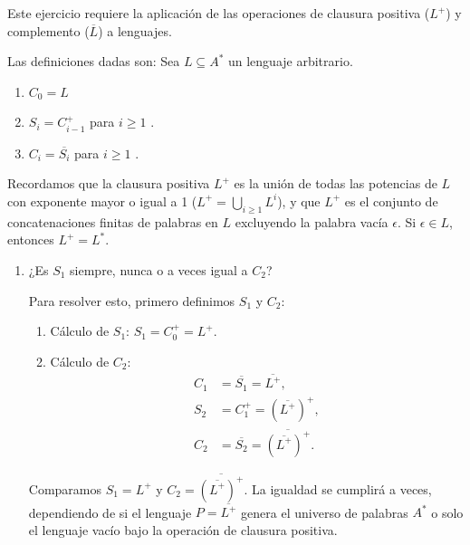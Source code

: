 \documentclass[12pt]{book} %
\begin{document}
\begin{solucion}

Este ejercicio requiere la aplicación de las operaciones de clausura positiva ($L^+$) y complemento ($\overline{L}$) a lenguajes.

Las definiciones dadas son: Sea $L \subseteq A^*$ un lenguaje arbitrario.
\begin{enumerate}
    \item $C_0 = L$
    \item $S_i = C_{i-1}^+$ para $i \geq 1$ .
    \item $C_i = \overline{S_i}$ para $i \geq 1$ .
\end{enumerate}

Recordamos que la clausura positiva $L^+$ es la unión de todas las potencias de $L$ con exponente mayor o igual a 1 ($L^+ = \bigcup_{i \geq 1} L^i$), y que $L^+$ es el conjunto de concatenaciones finitas de palabras en $L$ excluyendo la palabra vacía $\epsilon$. Si $\epsilon \in L$, entonces $L^+ = L^*$.



\begin{enumerate}[label=\alph*)]
    \item ¿Es $S_1$ siempre, nunca o a veces igual a $C_2$?

    Para resolver esto, primero definimos $S_1$ y $C_2$:
    \begin{enumerate}
        \item Cálculo de $S_1$: $S_1 = C_0^+ = L^+$.
        \item Cálculo de $C_2$: 
        \begin{align*}
        C_1 &= \overline{S_1} = \overline{L^+}, \\
        S_2 &= C_1^+ = (\overline{L^+})^+, \\
        C_2 &= \overline{S_2} = \overline{(\overline{L^+})^+}.
        \end{align*}
    \end{enumerate}

    Comparamos $S_1 = L^+$ y $C_2 = \overline{(\overline{L^+})^+}$. La igualdad se cumplirá a veces, dependiendo de si el lenguaje $P = \overline{L^+}$ genera el universo de palabras $A^*$ o solo el lenguaje vacío bajo la operación de clausura positiva.


\end{enumerate}
\end{solucion}
\end{document}
